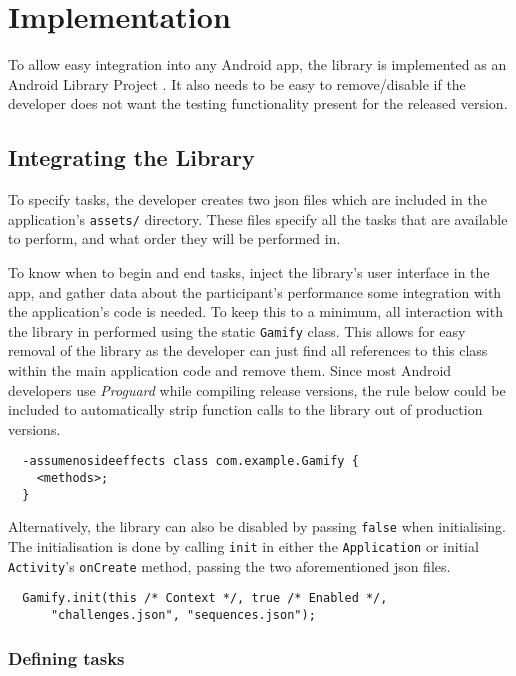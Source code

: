 \chapter{Implementation}

To allow easy integration into any Android app, the library is implemented
as an Android Library Project \cite{android-library}.  It also needs to be easy
to remove/disable if the developer does not want the testing functionality
present for the released version.

\section{Integrating the Library}

To specify tasks, the developer creates two json files which are
included in the application's \verb+assets/+ directory. These files specify all the tasks that are available to perform, and what order they will be performed in.

To know when to begin and end tasks, inject the library's user interface in the app, and gather data about the participant's performance some integration with the application's code is needed.
To keep this to a minimum, all interaction with
the library in performed using the static \verb/Gamify/ class. This allows for
easy removal of the library as the developer can just find all references to
this class within the main application code and remove them. Since most Android
developers use \emph{Proguard} while compiling release versions, the rule below could be
included to automatically strip function calls to the library out of production versions.

\begin{verbatim}
  -assumenosideeffects class com.example.Gamify {
    <methods>;
  }
\end{verbatim}

Alternatively, the library can also be disabled by passing \verb|false| when initialising. The
initialisation is done by calling \verb|init| in either the \verb|Application|
or initial \verb|Activity|'s \verb|onCreate| method, passing the two
aforementioned json files.

\begin{verbatim}
  Gamify.init(this /* Context */, true /* Enabled */,
      "challenges.json", "sequences.json");
\end{verbatim}

\subsection{Defining tasks}

